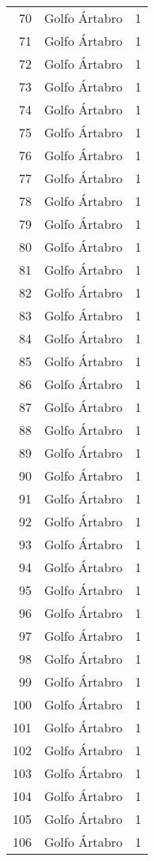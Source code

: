 \begin{table}[p]
\begin{tabular}{rlr}
  70 & Golfo Ártabro &   1 \\ 
  71 & Golfo Ártabro &   1 \\ 
  72 & Golfo Ártabro &   1 \\ 
  73 & Golfo Ártabro &   1 \\ 
  74 & Golfo Ártabro &   1 \\ 
  75 & Golfo Ártabro &   1 \\ 
  76 & Golfo Ártabro &   1 \\ 
  77 & Golfo Ártabro &   1 \\ 
  78 & Golfo Ártabro &   1 \\ 
  79 & Golfo Ártabro &   1 \\ 
  80 & Golfo Ártabro &   1 \\ 
  81 & Golfo Ártabro &   1 \\ 
  82 & Golfo Ártabro &   1 \\ 
  83 & Golfo Ártabro &   1 \\ 
  84 & Golfo Ártabro &   1 \\ 
  85 & Golfo Ártabro &   1 \\ 
  86 & Golfo Ártabro &   1 \\ 
  87 & Golfo Ártabro &   1 \\ 
  88 & Golfo Ártabro &   1 \\ 
  89 & Golfo Ártabro &   1 \\ 
  90 & Golfo Ártabro &   1 \\ 
  91 & Golfo Ártabro &   1 \\ 
  92 & Golfo Ártabro &   1 \\ 
  93 & Golfo Ártabro &   1 \\ 
  94 & Golfo Ártabro &   1 \\ 
  95 & Golfo Ártabro &   1 \\ 
  96 & Golfo Ártabro &   1 \\ 
  97 & Golfo Ártabro &   1 \\ 
  98 & Golfo Ártabro &   1 \\ 
  99 & Golfo Ártabro &   1 \\ 
  100 & Golfo Ártabro &   1 \\ 
  101 & Golfo Ártabro &   1 \\ 
  102 & Golfo Ártabro &   1 \\ 
  103 & Golfo Ártabro &   1 \\ 
  104 & Golfo Ártabro &   1 \\ 
  105 & Golfo Ártabro &   1 \\ 
  106 & Golfo Ártabro &   1 \\ 

\end{tabular}
\end{table}
